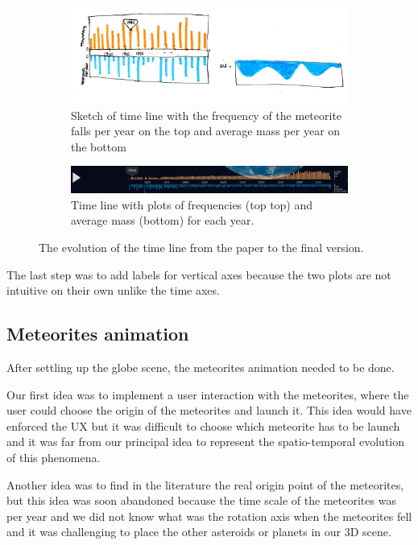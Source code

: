 \documentclass[10pt,conference,compsocconf]{IEEEtran}
\begin{document}
\begin{figure}
\centering
\begin{subfigure}{.45\textwidth}
  \centering
  \includegraphics[width=.8\linewidth]{images/timeline_sketch}
  \caption{Sketch of time line with the frequency of the meteorite falls per year on the top and average mass per year on the bottom}
  \label{fig:timeline_sketch}
\end{subfigure}%
\begin{subfigure}{.45\textwidth}
  \centering
  \includegraphics[width=.8\linewidth]{images/timeline_final_without_label.png}
  \caption{Time line with plots of frequencies (top top) and average mass (bottom) for each year.}
  \label{fig:timeline_final_without_label}
\end{subfigure}
\caption{The evolution of the time line from the paper to the final version.}
\label{fig:test}
\end{figure}

The last step was to add labels for vertical axes because the two plots are not intuitive on their own unlike the time axes.

\subsection{Meteorites animation}
After settling up the globe scene, the meteorites animation needed to be done. 

Our first idea was to implement a user interaction with the meteorites, where the user could choose the origin of the meteorites and launch it. This idea would have enforced the UX but it was difficult to choose which meteorite has to be launch and it was far from our principal idea to represent the spatio-temporal evolution of this phenomena. 

Another idea was to find in the literature the real origin point of the meteorites, but this idea was soon abandoned because the time scale of the meteorites was per year and we did not know what was the rotation axis when the meteorites fell and it was challenging to place the other asteroids or planets in our 3D scene. 
\end{document}
